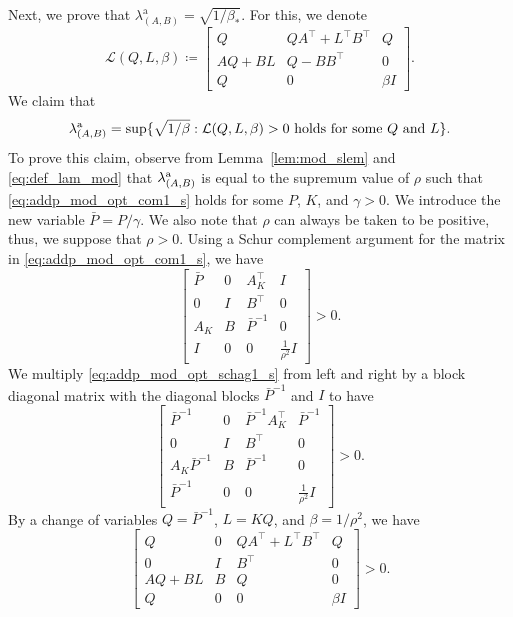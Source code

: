\documentclass[9pt,shortpaper,twoside,web]{ieeecolor}
\begin{document}
Next, we prove that $\lambda_{(A,B)}^{\text{a}}=\sqrt{1/\beta_*}$. For this, we denote
\begin{equation}
\label{eq:mod_slmi}
\mathcal{L}(Q,L,\beta) \coloneqq\begin{bmatrix}
Q & QA^\top+L^\top B^\top  & Q \\
AQ+BL & Q-BB^\top  & 0 \\
Q & 0  & \beta I
\end{bmatrix}.
\end{equation} 
We claim that
\begin{equation}
\label{eq:claim_mod}
    \lambda^\textup{a}_{(A,B)}=\sup\{\sqrt{1/\beta}: \mathcal{L}(Q,L,\beta) > 0 \text{ holds for some } Q \text{ and } L\}.
\end{equation}
To prove this claim, observe from Lemma~\ref{lem:mod_slem} and \eqref{eq:def_lam_mod} that $\lambda^\textup{a}_{(A,B)}$ is equal to the supremum value of $\rho$ such that \eqref{eq:addp_mod_opt_com1_s} holds for some $P$, $K$, and $\gamma > 0$. We introduce the new variable $\bar P=P/\gamma$. We also note that $\rho$ can always be taken to be positive, thus, we suppose that $\rho > 0$. Using a Schur complement argument for the matrix in \eqref{eq:addp_mod_opt_com1_s}, we have
\begin{equation}
\label{eq:addp_mod_opt_schag1_s}
\begin{bmatrix}
    \bar P & 0 & A_K^\top & I  \\
    0 &  I & B^\top & 0 \\
    A_K & B & \bar P^{-1} & 0\\
    I & 0 & 0 & \frac{1}{\rho^2}I 
\end{bmatrix} > 0.
\end{equation} 
We multiply \eqref{eq:addp_mod_opt_schag1_s} from left and right by a block diagonal matrix with the diagonal blocks $\bar P^{-1}$ and $I$ to have
\begin{equation}
\label{eq:addp_mod_opt_schag1_s_mul}
\begin{bmatrix}
    \bar P^{-1} & 0 & \bar P^{-1}A_K^\top & \bar P^{-1}  \\
    0 &  I & B^\top & 0 \\
    A_K\bar P^{-1} & B & \bar P^{-1} & 0\\
    \bar P^{-1} & 0 & 0 & \frac{1}{\rho^2}I 
\end{bmatrix} > 0.
\end{equation} 
By a change of variables $Q=\bar P^{-1}$, $L=KQ$, and $\beta=1/\rho^2$, we have
\begin{equation}
\label{eq:addp_mod_opt_LMI1_s}
    \begin{bmatrix}
        Q & 0 &   QA^\top + L^\top B^\top & Q \\
        0 & I  & B^\top & 0 \\
        AQ+BL& B  & Q & 0 \\
        Q & 0 & 0 & \beta I
    \end{bmatrix} > 0.
\end{equation}
\end{document}
